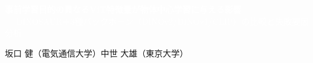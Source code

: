 \documentclass[dvipdfmx,a4paper,landscape]{jarticle}
\begin{document}
\noindent
\colorbox{titleblue}{\parbox{\dimexpr\linewidth-2\fboxsep\relax}{\centering\vspace{1mm}%
  \textcolor{white}{\large\textbf{%
    事前学習目的の異なるViT特徴量が物体中心学習に与える影響}}\\[1mm]
  \textcolor{white}{\scriptsize%
    --- DINOSAUR＋3種バックボーン（DINOv2/DINOv1/CLIP）の比較と失敗要因分析 ---}%
\vspace{1mm}}}

\vspace{0.5mm}
\noindent\hfill{\scriptsize 坂口 健（電気通信大学）\quad 中世 大雄（東京大学）}

\vspace{1.5mm}
\end{document}

